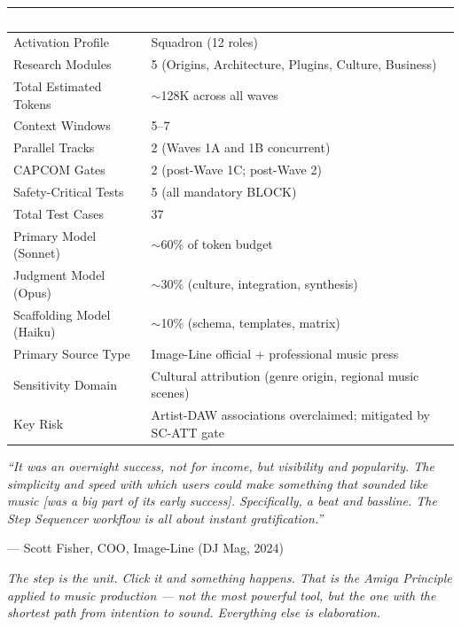\documentclass[11pt,letterpaper]{article}
\newcommand{\tableheader}[1]{\textbf{\sffamily\textcolor{white}{#1}}}
\begin{document}
\begin{center}
\begin{tabularx}{\textwidth}{L{4cm}X}
\toprule
{}
\tableheader{Metric} & \tableheader{Value} \\
\midrule
Activation Profile & Squadron (12 roles) \\
Research Modules & 5 (Origins, Architecture, Plugins, Culture, Business) \\
Total Estimated Tokens & $\sim$128K across all waves \\
Context Windows & 5--7 \\
Parallel Tracks & 2 (Waves 1A and 1B concurrent) \\
CAPCOM Gates & 2 (post-Wave 1C; post-Wave 2) \\
Safety-Critical Tests & 5 (all mandatory BLOCK) \\
Total Test Cases & 37 \\
Primary Model (Sonnet) & $\sim$60\% of token budget \\
Judgment Model (Opus) & $\sim$30\% (culture, integration, synthesis) \\
Scaffolding Model (Haiku) & $\sim$10\% (schema, templates, matrix) \\
Primary Source Type & Image-Line official + professional music press \\
Sensitivity Domain & Cultural attribution (genre origin, regional music scenes) \\
Key Risk & Artist-DAW associations overclaimed; mitigated by SC-ATT gate \\
\bottomrule
\end{tabularx}
\end{center}

\vspace{2em}

\begin{quotebox}
\textit{``It was an overnight success, not for income, but visibility and popularity. The simplicity and speed with which users could make something that sounded like music [was a big part of its early success]. Specifically, a beat and bassline. The Step Sequencer workflow is all about instant gratification.''}

\vspace{0.5em}
\hfill --- Scott Fisher, COO, Image-Line (DJ Mag, 2024)

\vspace{1em}
\textit{The step is the unit. Click it and something happens. That is the Amiga Principle applied to music production --- not the most powerful tool, but the one with the shortest path from intention to sound. Everything else is elaboration.}
\end{quotebox}
\end{document}
